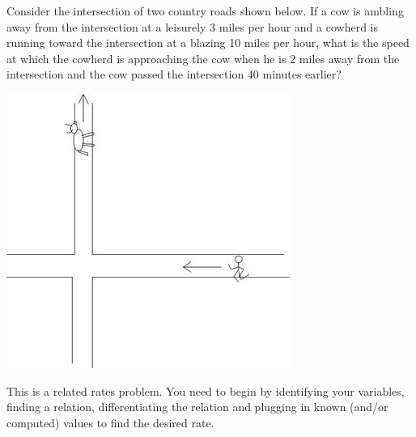 \documentclass{ximera}
\author{Emma Smith Zbarsky}
\begin{document}
\begin{exercise}

Consider the intersection of two country roads shown below. If a cow is
ambling away from the intersection at a leisurely 3 miles per hour and a
cowherd is running toward the intersection at a blazing 10 miles per
hour, what is the speed at which the cowherd is approaching the cow when
he is 2 miles away from the intersection and the cow passed the
intersection 40 minutes earlier?



\begin{image}\includegraphics{relatedrates-cow.jpg}\end{image}


\begin{hint}
This is a related rates problem. You need to begin by identifying your
variables, finding a relation, differentiating the relation and plugging
in known (and/or computed) values to find the desired rate.
\end{hint}



\end{exercise}
\end{document}
